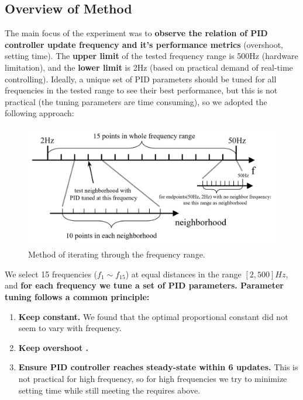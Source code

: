 \documentclass[conference]{IEEEtran}
\begin{document}
% 

\subsection{Overview of Method}
\label{PIDTuningMethod}
The main focus of the experiment was to \textbf{observe the relation of PID controller update frequency and it's performance metrics} (overshoot, setting time). The \textbf{upper limit} of the tested frequency range is 500Hz (hardware limitation), and the \textbf{lower limit} is 2Hz (based on practical demand of real-time controlling). Ideally, a unique set of PID parameters should be tuned for all frequencies in the tested range to see their best performance, but this is not practical (the tuning parameters are time consuming), so we adopted the following approach: 

\begin{figure}[htbp]
\centerline{\includegraphics[width=\linewidth]{Report/Pic/FrequencyRangeExplained_2.png}}
\caption{Method of iterating through the frequency range.}%
\label{fig_FrequencyRange}
\end{figure}

We select 15 frequencies ($f_{1}\sim f_{15}$) at equal distances in the range $[2,500]Hz$,  and \textbf{for each frequency we tune a set of PID parameters. Parameter tuning follows a common principle:}
\begin{enumerate}
    \item\textbf{ Keep  constant. }We found that the optimal proportional constant did not seem to vary with frequency.
    \item\textbf{ Keep overshoot . }
    \item\textbf{ Ensure PID controller reaches steady-state within 6 updates.} This is not practical for high frequency, so for high frequencies we try to minimize setting time  while still meeting the requires above. 
\end{enumerate}
\end{document}
